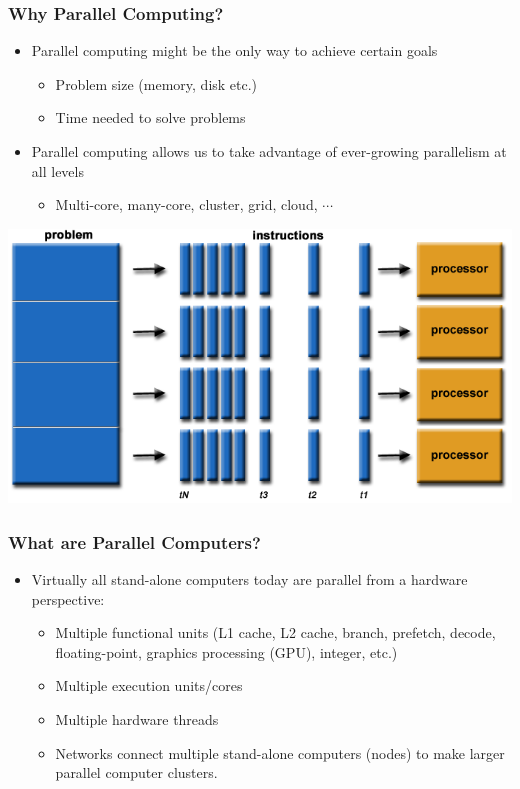 \documentclass[10pt,t]{beamer}
\begin{document}
\begin{frame}
\frametitle{Why Parallel Computing?}
\begin{itemize}
 \item Parallel computing might be the only way to achieve certain goals
 \begin{itemize}
\item Problem size (memory, disk etc.)
\item Time needed to solve problems
\end{itemize}
\item Parallel computing allows us to take advantage of ever-growing parallelism at all levels
\begin{itemize}
\item  Multi-core, many-core, cluster, grid, cloud, $\cdots$
\end{itemize}
\end{itemize}
\includegraphics[width=\textwidth]{./parallelProblem}
\end{frame}

\begin{frame}
\frametitle{What are Parallel Computers?}
\begin{itemize}
\item Virtually all stand-alone computers today are parallel from a hardware perspective:
\begin{itemize}
\item Multiple functional units (L1 cache, L2 cache, branch, prefetch, decode, floating-point, graphics processing (GPU), integer, etc.)
\item Multiple execution units/cores
\item Multiple hardware threads
\item Networks connect multiple stand-alone computers (nodes) to make larger parallel computer clusters.
\end{itemize}
\end{itemize}
\end{frame}
\end{document}
